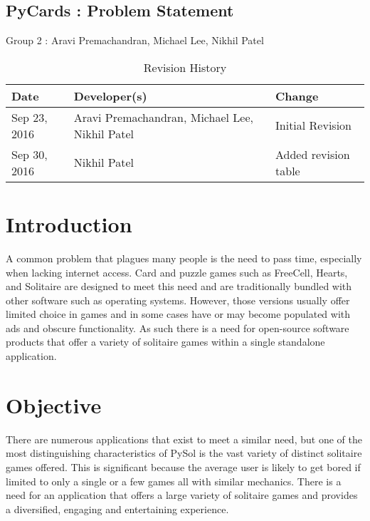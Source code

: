 \documentclass{article}
\begin{document}
	\begin{center}
		\section*{PyCards : Problem Statement}
		Group 2 : Aravi Premachandran, Michael Lee, Nikhil Patel
	\end{center}
	
	\begin{table}[hp]
		\caption{Revision History} \label{TblRevisionHistory}
		\begin{tabularx}{\textwidth}{llX}
		\toprule
		\textbf{Date} & \textbf{Developer(s)}& \textbf{Change}\\
		\midrule
		Sep 23, 2016 & Aravi Premachandran, Michael Lee, Nikhil Patel
		& Initial Revision\\ 
		Sep 30, 2016 & Nikhil Patel & Added revision table\\ 
		\bottomrule
		\end{tabularx}
	\end{table}

	\section{Introduction}
	A common problem that plagues many people is the need to pass time, 
	especially when lacking internet access. Card and puzzle games such as 
	FreeCell, Hearts, and Solitaire are designed to meet this need and are 
	traditionally bundled with other software such as operating systems. 
	However, those versions usually offer limited choice in games and in some 
	cases have or may become populated with ads and obscure functionality. As 
	such there is a need for open-source software products that offer a variety 
	of solitaire games within a single standalone application.
	
	\section{Objective}
	There are numerous applications that exist to meet a similar need, but one 
	of the most distinguishing characteristics of PySol is the vast variety of 
	distinct solitaire games offered. This is significant because the average 
	user is likely to get bored if limited to only a single or a few games all 
	with similar mechanics. There is a need for an application that offers a 
	large variety of solitaire games and provides a diversified, engaging and 
	entertaining experience.
	
\end{document}

